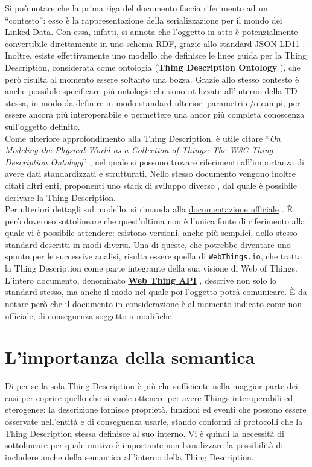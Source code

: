 \documentclass[12pt,a4paper,openright,oneside]{report}
\newcommand{\quotes}[1]{``#1''}
\begin{document}
Si può notare che la prima riga del documento faccia riferimento ad un \quotes{contesto}: esso è la rappresentazione della serializzazione per il mondo dei Linked Data. Con essa, infatti, si annota che l'oggetto in atto è potenzialmente convertibile direttamente in uno schema RDF, grazie allo standard JSON-LD11 \cite{json-ld}. Inoltre, esiste effettivamente uno modello che definisce le linee guida per la Thing Description, considerata come ontologia (\textbf{Thing Description Ontology} \cite{td}), che però risulta al momento essere soltanto una bozza. Grazie allo stesso contesto è anche possibile specificare più ontologie che sono utilizzate all'interno della TD stessa, in modo da definire in modo standard ulteriori parametri e/o campi, per essere ancora più interoperabile e permettere una ancor più completa conoscenza sull'oggetto definito.\\

Come ulteriore approfondimento alla Thing Description, è utile citare \quotes{\textit{On Modeling the Physical World as a Collection of Things: The W3C Thing Description Ontology}} \cite{td-paper}, nel quale si possono trovare riferimenti all'importanza di avere dati standardizzati e strutturati. Nello stesso documento vengono inoltre citati altri enti, proponenti uno stack di sviluppo diverso \cite{open-connectivity}, dal quale è possibile derivare la Thing Description.\\

Per ulteriori dettagli sul modello, si rimanda alla \underline{documentazione ufficiale} \cite{td}. È però doveroso sottolineare che quest'ultima non è l'unica fonte di riferimento alla quale vi è possibile attendere: esistono versioni, anche più semplici, dello stesso standard descritti in modi diversi. Una di queste, che potrebbe diventare uno spunto per le successive analisi, risulta essere quella di \texttt{WebThings.io}, che tratta la Thing Description come parte integrante della sua visione di Web of Things. L'intero documento, denominato \href{https://webthings.io/api/}{\textbf{Web Thing API}} \cite{webthings}, descrive non solo lo standard stesso, ma anche il modo nel quale poi l'oggetto potrà comunicare. È da notare però che il documento in considerazione è al momento indicato come non ufficiale, di conseguenza soggetto a modifiche.\\


\section{L'importanza della semantica}
\label{sec:semantic}
Di per se la sola Thing Description è più che sufficiente nella maggior parte dei casi per coprire quello che si vuole ottenere per avere Things interoperabili ed eterogenee: la descrizione fornisce proprietà, funzioni ed eventi che possono essere osservate nell'entità e di conseguenza usarle, stando conformi ai protocolli che la Thing Description stessa definisce al suo interno. Vi è quindi la necessità di sottolineare per quale motivo è importante non banalizzare la possibilità di includere anche della semantica all'interno della Thing Description.\\
\end{document}
